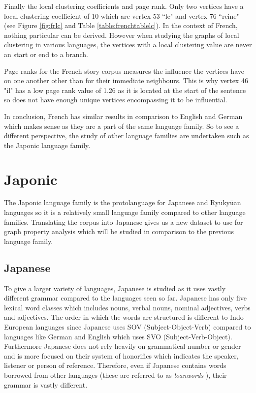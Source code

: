 Finally the local clustering coefficients and page rank. Only two vertices have a local clustering coefficient of 10 which are vertex 53 ``le" and vertex 76 ``reine" (see Figure \ref{fig:frlc} and Table \ref{table:frenchtablelc}). In the context of French, nothing particular can be derived. However when studying the graphs of local clustering in various languages, the vertices with a local clustering value are never an start or end to a branch.

Page ranks for the French story corpus measures the influence the vertices have on one another other than for their immediate neighbours. This is why vertex 46 "il" has a low page rank value of 1.26 as it is located at the start of the sentence so does not have enough unique vertices encompassing it to be influential.

In conclusion, French has similar results in comparison to English and German which makes sense as they are a part of the same language family. So to see a different perspective, the study of other language families are undertaken such as the Japonic language family.

\section{Japonic}
The Japonic language family is the protolanguage for Japanese and Ryūkyūan languages \cite{vovin2017origins} so it is a relatively small language family compared to other language families. Translating the corpus into Japanese gives us a new dataset to use for graph property analysis which will be studied in comparison to the previous language family.
\subsection{Japanese}
To give a larger variety of languages, Japanese is studied as it uses vastly different grammar compared to the languages seen so far. Japanese has only five lexical word classes which includes nouns, verbal nouns, nominal adjectives, verbs and adjectives. The order in which the words are structured is different to Indo-European languages since Japanese uses SOV (Subject-Object-Verb) compared to languages like German and English which uses SVO (Subject-Verb-Object). Furthermore Japanese does not rely heavily on grammatical number or gender and is more focused on their system of honorifics which indicates the speaker, listener or person of reference. Therefore, even if Japanese contains words borrowed from other languages (these are referred to as \emph{loanwords} \cite{miura1979influence}), their grammar is vastly different. 

